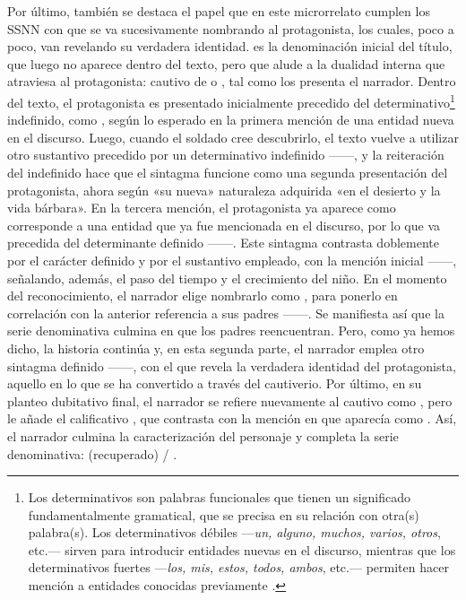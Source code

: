 Por último, también se destaca el papel que en este microrrelato cumplen los
SSNN con que se va sucesivamente nombrando al protagonista, los cuales, poco a
poco, van revelando su verdadera identidad.  es la
denominación inicial del título, que luego no aparece dentro del texto, pero
que alude a la dualidad interna que atraviesa al protagonista: cautivo de
 o , tal como los presenta el
narrador. Dentro del texto, el protagonista es presentado inicialmente
precedido del determinativo\footnote{Los determinativos son palabras
funcionales que tienen un significado fundamentalmente gramatical, que se
precisa en su relación con otra(s) palabra(s). Los determinativos débiles
---\textit{un, alguno, muchos, varios, otros}, etc.--- sirven para introducir
entidades nuevas en el discurso, mientras que los determinativos fuertes
---\textit{los, mis, estos, todos, ambos}, etc.--- permiten hacer mención a
entidades conocidas previamente \parencite{giammatteo2009}.} indefinido, como
, según lo esperado en la primera mención de una entidad nueva
en el discurso. Luego, cuando el soldado cree descubrirlo, el texto vuelve a
utilizar otro sustantivo precedido por un determinativo indefinido ------, y la reiteración del indefinido hace que el sintagma
funcione como una segunda presentación del protagonista, ahora según «su
nueva» naturaleza adquirida «en el desierto y la vida bárbara». En la tercera
mención, el protagonista ya aparece como corresponde a una entidad que ya fue
mencionada en el discurso, por lo que va precedida del determinante definido
------. Este sintagma contrasta doblemente por el carácter
definido y por el sustantivo empleado, con la mención inicial ------, señalando, además, el paso del tiempo y el crecimiento del niño. En
el momento del reconocimiento, el narrador elige nombrarlo como , para ponerlo en correlación con la anterior referencia a sus padres
------. Se
manifiesta así que la serie denominativa  culmina en  que los padres reencuentran.
Pero, como ya hemos dicho, la historia continúa y, en esta segunda parte, el
narrador emplea otro sintagma definido ------, con el que
revela la verdadera identidad del protagonista, aquello en lo que se ha
convertido a través del cautiverio. Por último, en su planteo dubitativo final,
el narrador se refiere nuevamente al cautivo como , pero le
añade el calificativo , que contrasta con la mención en que
aparecía como . Así, el
narrador culmina la caracterización del personaje y completa la serie
denominativa:  (recuperado) / .

